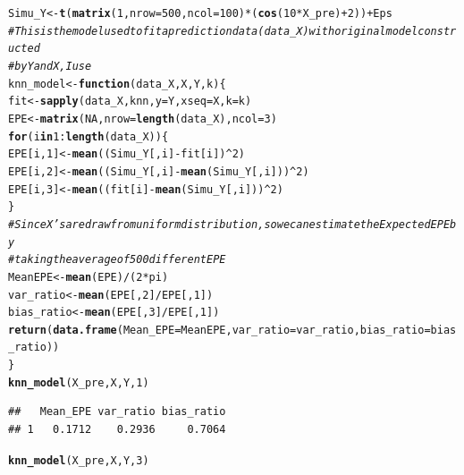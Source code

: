 \documentclass{article}\usepackage[]{graphicx}\usepackage[]{color}
\makeatletter
\newcommand{\hlnum}[1]{\textcolor[rgb]{0.686,0.059,0.569}{#1}}%
\newcommand{\hlcom}[1]{\textcolor[rgb]{0.678,0.584,0.686}{\textit{#1}}}%
\newcommand{\hlopt}[1]{\textcolor[rgb]{0,0,0}{#1}}%
\newcommand{\hlstd}[1]{\textcolor[rgb]{0.345,0.345,0.345}{#1}}%
\newcommand{\hlkwa}[1]{\textcolor[rgb]{0.161,0.373,0.58}{\textbf{#1}}}%
\newcommand{\hlkwb}[1]{\textcolor[rgb]{0.69,0.353,0.396}{#1}}%
\newcommand{\hlkwc}[1]{\textcolor[rgb]{0.333,0.667,0.333}{#1}}%
\newcommand{\hlkwd}[1]{\textcolor[rgb]{0.737,0.353,0.396}{\textbf{#1}}}%
\newenvironment{kframe}{%
 \def\at@end@of@kframe{}%
 \ifinner\ifhmode%
  \def\at@end@of@kframe{\end{minipage}}%
  \begin{minipage}{\columnwidth}%
 \fi\fi%
 \def\FrameCommand##1{\hskip\@totalleftmargin \hskip-\fboxsep
 \colorbox{shadecolor}{##1}\hskip-\fboxsep
     \hskip-\linewidth \hskip-\@totalleftmargin \hskip\columnwidth}%
 \MakeFramed {\advance\hsize-\width
   \@totalleftmargin\z@ \linewidth\hsize
   \@setminipage}}%
 {\par\unskip\endMakeFramed%
 \at@end@of@kframe}
\newenvironment{knitrout}{}{} %
\makeatother
\begin{document}
\begin{knitrout}
\begin{kframe}
\begin{alltt}
\hlstd{Simu_Y} \hlkwb{<-} \hlkwd{t}\hlstd{(}\hlkwd{matrix}\hlstd{(}\hlnum{1}\hlstd{,} \hlkwc{nrow} \hlstd{=} \hlnum{500}\hlstd{,} \hlkwc{ncol} \hlstd{=} \hlnum{100}\hlstd{)} \hlopt{*} \hlstd{(}\hlkwd{cos}\hlstd{(}\hlnum{10} \hlopt{*} \hlstd{X_pre)} \hlopt{+} \hlnum{2}\hlstd{))} \hlopt{+} \hlstd{Eps}
\hlcom{# This is the model used to fit a prediction data(data_X) with original model constructed}
\hlcom{# by Y and X, I use}
\hlstd{knn_model} \hlkwb{<-} \hlkwa{function}\hlstd{(}\hlkwc{data_X}\hlstd{,} \hlkwc{X}\hlstd{,} \hlkwc{Y}\hlstd{,} \hlkwc{k}\hlstd{) \{}
    \hlstd{fit} \hlkwb{<-} \hlkwd{sapply}\hlstd{(data_X, knn,} \hlkwc{y} \hlstd{= Y,} \hlkwc{xseq} \hlstd{= X,} \hlkwc{k} \hlstd{= k)}
    \hlstd{EPE} \hlkwb{<-} \hlkwd{matrix}\hlstd{(}\hlnum{NA}\hlstd{,} \hlkwc{nrow} \hlstd{=} \hlkwd{length}\hlstd{(data_X),} \hlkwc{ncol} \hlstd{=} \hlnum{3}\hlstd{)}
    \hlkwa{for} \hlstd{(i} \hlkwa{in} \hlnum{1}\hlopt{:}\hlkwd{length}\hlstd{(data_X)) \{}
        \hlstd{EPE[i,} \hlnum{1}\hlstd{]} \hlkwb{<-} \hlkwd{mean}\hlstd{((Simu_Y[, i]} \hlopt{-} \hlstd{fit[i])}\hlopt{^}\hlnum{2}\hlstd{)}
        \hlstd{EPE[i,} \hlnum{2}\hlstd{]} \hlkwb{<-} \hlkwd{mean}\hlstd{((Simu_Y[, i]} \hlopt{-} \hlkwd{mean}\hlstd{(Simu_Y[, i]))}\hlopt{^}\hlnum{2}\hlstd{)}
        \hlstd{EPE[i,} \hlnum{3}\hlstd{]} \hlkwb{<-} \hlkwd{mean}\hlstd{((fit[i]} \hlopt{-} \hlkwd{mean}\hlstd{(Simu_Y[, i]))}\hlopt{^}\hlnum{2}\hlstd{)}
    \hlstd{\}}
    \hlcom{# Since X's are draw from uniform distribution, so we can estimate the Expected EPE by}
    \hlcom{# taking the average of 500 different EPE}
    \hlstd{MeanEPE} \hlkwb{<-} \hlkwd{mean}\hlstd{(EPE)}\hlopt{/}\hlstd{(}\hlnum{2} \hlopt{*} \hlstd{pi)}
    \hlstd{var_ratio} \hlkwb{<-} \hlkwd{mean}\hlstd{(EPE[,} \hlnum{2}\hlstd{]}\hlopt{/}\hlstd{EPE[,} \hlnum{1}\hlstd{])}
    \hlstd{bias_ratio} \hlkwb{<-} \hlkwd{mean}\hlstd{(EPE[,} \hlnum{3}\hlstd{]}\hlopt{/}\hlstd{EPE[,} \hlnum{1}\hlstd{])}
    \hlkwd{return}\hlstd{(}\hlkwd{data.frame}\hlstd{(}\hlkwc{Mean_EPE} \hlstd{= MeanEPE,} \hlkwc{var_ratio} \hlstd{= var_ratio,} \hlkwc{bias_ratio} \hlstd{= bias_ratio))}
\hlstd{\}}
\hlkwd{knn_model}\hlstd{(X_pre, X, Y,} \hlnum{1}\hlstd{)}
\end{alltt}
\begin{verbatim}
##   Mean_EPE var_ratio bias_ratio
## 1   0.1712    0.2936     0.7064
\end{verbatim}
\begin{alltt}
\hlkwd{knn_model}\hlstd{(X_pre, X, Y,} \hlnum{3}\hlstd{)}
\end{alltt}
\begin{verbatim}

\end{verbatim}
\end{kframe}
\end{knitrout}
\end{document}
